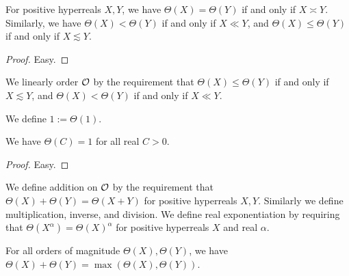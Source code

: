 \begin{lemma}\label{theta-kernel}\leanok For positive hyperreals $X,Y$, we have $\Theta(X) = \Theta(Y)$ if and only if $X \asymp Y$.  Similarly, we have $\Theta(X) < \Theta(Y)$ if and only if $X \ll Y$, and $\Theta(X) \leq \Theta(Y)$ if and only if $X \lesssim Y$.
\end{lemma}

\begin{proof}\leanok Easy.
\end{proof}

\begin{definition}\label{ord-mag-def}\leanok  We linearly order ${\mathcal O}$ by the requirement that $\Theta(X) \leq \Theta(Y)$ if and only if $X \lesssim Y$, and  $\Theta(X) < \Theta(Y)$ if and only if $X \ll Y$.
\end{definition}

\begin{definition}[One]\label{one-def}\label{OrderOfMagnitude.one}\leanok We define $1 := \Theta(1)$.
\end{definition}

\begin{lemma}\label{const-triv}\leanok We have $\Theta(C) = 1$ for all real $C>0$.
\end{lemma}

\begin{proof}\leanok Easy.
\end{proof}

\begin{definition}\label{mag-arith}\leanok  We define addition on ${\mathcal O}$ by the requirement that $\Theta(X) + \Theta(Y) = \Theta(X+Y)$ for positive hyperreals $X,Y$.  Similarly we define multiplication, inverse, and division.  We define real exponentiation by requiring that $\Theta(X^\alpha) = \Theta(X)^\alpha$ for positive hyperreals $X$ and real $\alpha$.
\end{definition}

\begin{lemma}\label{tropical-add}\leanok For all orders of magnitude $\Theta(X), \Theta(Y)$, we have $\Theta(X) + \Theta(Y) = \max(\Theta(X), \Theta(Y))$.
\end{lemma}

